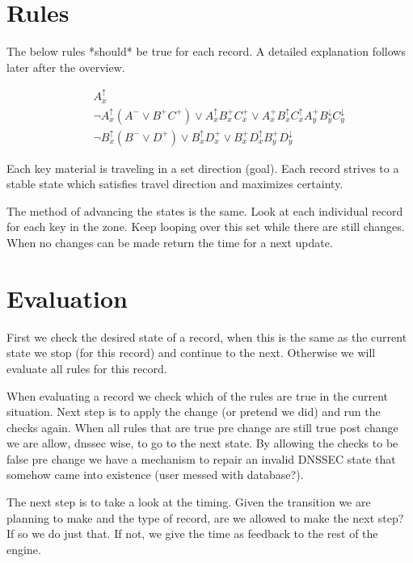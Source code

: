 \documentclass[twoside, a4paper]{article}
\begin{document}
\section{Rules}

The below rules *should* be true for each record. A detailed explanation follows 
later after the overview.

\begin{eqnarray}
&& A_{x}^{\uparrow} \\
&& \neg A_{x}^{\uparrow} (A^{-} \vee B^{+} C^{+}) \vee A_{x}^{\uparrow}
	B_{x}^{+} C_{x}^{+} \vee A_{x}^{+} B_{x}^{\uparrow} C_{x}^{\uparrow}
	A_{y}^{+} B_{y}^{\downarrow} C_{y}^{\downarrow}\\
&& \neg B_{x}^{\uparrow} (B^{-} \vee D^{+}) \vee B_{x}^{\uparrow}
	D_{x}^{+} \vee B_{x}^{+} D_{x}^{\uparrow} B_{y}^{+}
	D_{y}^{\downarrow}
\end{eqnarray}

Each key material is traveling in a set direction (goal). Each record strives to
a stable state which satisfies travel direction and maximizes certainty. 

The method of advancing the states is the same. Look at each individual  record
for each key in the zone. Keep looping over this set while there are 
still changes. When no changes can be made return the time for a next update.

\section{Evaluation}

First we check the desired state of a record, when this is the same as the
current state we stop (for this record) and continue to the next. Otherwise
we will evaluate all rules for this record.

When evaluating a record we check which of the rules are true in the current situation.
Next step is to apply the change (or pretend we did) and run the checks
again. When all rules that are true pre change are still true post change we
are allow, dnssec wise, to go to the next state. By allowing the checks 
to be false pre change we have a mechanism to repair an invalid DNSSEC 
state that somehow came into existence (user messed with database?).

The next step is to take a look at the timing. Given the transition we
are planning to make and the type of record, are we allowed to make the next step?
If so we do just that. If not, we give the time as feedback to the rest of
the engine.
\end{document}
